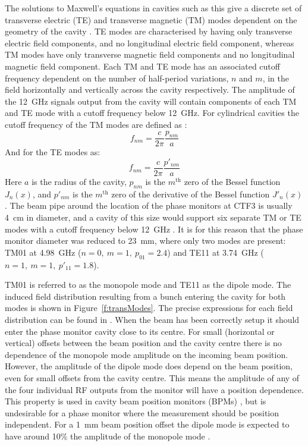 The solutions to Maxwell's equations in cavities such as this give a discrete set of transverse electric (TE) and transverse magnetic (TM) modes dependent on the geometry of the cavity \cite{collinsWvGd}. TE modes are characterised by having only transverse electric field components, and no longitudinal electric field component, whereas TM modes have only transverse magnetic field components and no longitudinal magnetic field component. Each TM and TE mode has an associated cutoff frequency dependent on the number of half-period variations, \(n\) and \(m\), in the field horizontally and vertically across the cavity respectively. The amplitude of the 12~GHz signals output from the cavity will contain components of each TM and TE mode with a cutoff frequency below 12~GHz. For cylindrical cavities the cutoff frequency of the TM modes are defined as \cite{collinsWvGd}:
\begin{equation}
f_{nm} = \frac{c}{2\pi}\frac{p_{nm}}{a} 
\end{equation}
And for the TE modes as:
\begin{equation}
f_{nm} = \frac{c}{2\pi}\frac{p'_{nm}}{a} 
\end{equation}
Here \(a\) is the radius of the cavity, \(p_{nm}\) is the \(m^\mathrm{th}\) zero of the Bessel function \(J_n(x)\), and \(p'_{nm}\) is the \(m^\mathrm{th}\) zero of the derivative of the Bessel function \(J'_n(x)\) \cite{kreyszig}. The beam pipe around the location of the phase monitors at CTF3 is usually 4~cm in diameter, and a cavity of this size would support six separate TM or TE modes with a cutoff frequency below 12~GHz \cite{phMonIPAC10}. It is for this reason that the phase monitor diameter was reduced to 23~mm, where only two modes are present: TM01 at 4.98~GHz (\(n=0,~m=1,~p_{01}=2.4\)) and TE11 at 3.74~GHz (\(n=1,~m=1,~p'_{11}=1.8\)).

TM01 is referred to as the monopole mode and TE11 as the dipole mode. The induced field distribution resulting from a bunch entering the cavity for both modes is shown in Figure~\ref{f:transModes}. The precise expressions for each field distribution can be found in \cite{lipka}. When the beam has been correctly setup it should enter the phase monitor cavity close to its centre. For small (horizontal or vertical) offsets between the beam position and the cavity centre there is no dependence of the monopole mode amplitude on the incoming beam position. However, the amplitude of the dipole mode does depend on the beam position, even for small offsets from the cavity centre. This means the amplitude of any of the four individual RF outputs from the monitor will have a position dependence. This property is used in cavity beam position monitors (BPMs) \cite{lipka}, but is undesirable for a phase monitor where the measurement should be position independent. For a 1~mm beam position offset the dipole mode is expected to have around 10\% the amplitude of the monopole mode \cite{alexCWS13}.

